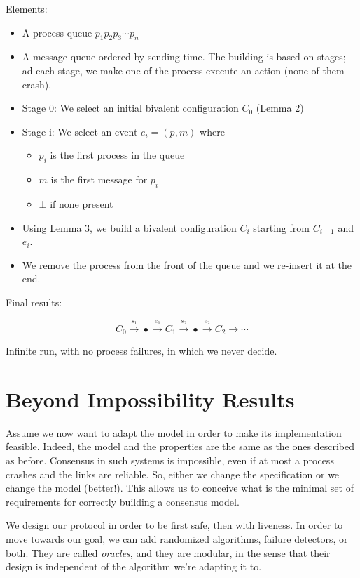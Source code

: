 \documentclass[a4paper,11pt,hidelinks]{article}
\begin{document}
Elements:

\begin{itemize}
    \item A process queue $p_1 p_2 p_3 \cdots p_n$
    \item A message queue ordered by sending time. The building is based on stages; ad each stage, we make one of the process execute an action (none of them crash).
    \item Stage 0: We select an initial bivalent configuration $C_0$ (Lemma 2)
    \item Stage i: We select an event $e_i = (p, m)$ where \begin{itemize}
              \item $p_i$ is the first process in the queue
              \item $m$ is the first message for $p_i$
              \item $\bot$ if none present
          \end{itemize}
    \item Using Lemma 3, we build a bivalent configuration $C_i$ starting from $C_{i−1}$ and $e_i$.
    \item We remove the process from the front of the queue and we re-insert it at the end.
\end{itemize}

Final results:

$$
    C_0 \xrightarrow{s_1} \bullet \xrightarrow{e_1} C_1 \xrightarrow{s_2} \bullet \xrightarrow{e_2} C_2 \rightarrow \cdots
$$

Infinite run, with no process failures, in which we never decide.

\section{Beyond Impossibility Results}

Assume we now want to adapt the model in order to make its implementation feasible. Indeed, the model and the properties are the same as the ones described as before. Consensus in such systems is impossible, even if at most a process crashes and the links are reliable. So, either we change the specification or we change the model (better!). This allows us to conceive what is the minimal set of requirements for correctly building a consensus model.

We design our protocol in order to be first safe, then with liveness. In order to move towards our goal, we can add randomized algorithms, failure detectors, or both. They are called \textit{oracles}, and they are modular, in the sense that their design is independent of the algorithm we're adapting it to.
\end{document}
